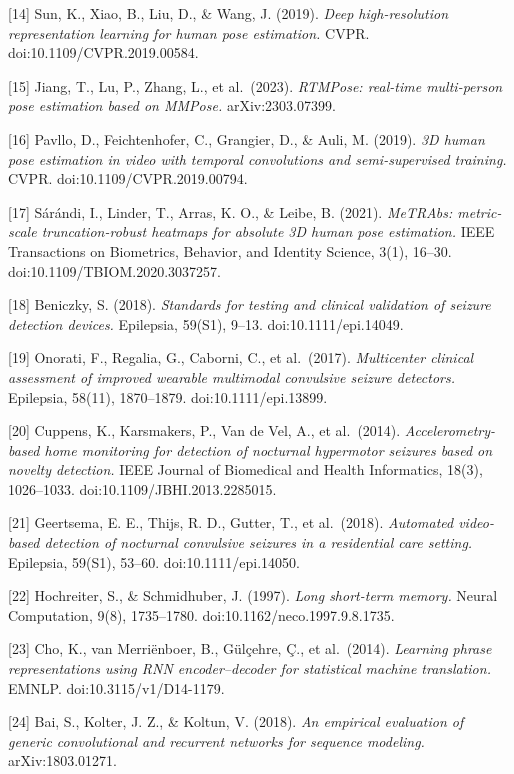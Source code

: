\documentclass[
  11pt,
]{article}
\begin{document}
{[}14{]} Sun, K., Xiao, B., Liu, D., \& Wang, J. (2019). \emph{Deep
high-resolution representation learning for human pose estimation.}
CVPR. doi:10.1109/CVPR.2019.00584.

{[}15{]} Jiang, T., Lu, P., Zhang, L., et al.~(2023). \emph{RTMPose:
real-time multi-person pose estimation based on MMPose.}
arXiv:2303.07399.

{[}16{]} Pavllo, D., Feichtenhofer, C., Grangier, D., \& Auli, M.
(2019). \emph{3D human pose estimation in video with temporal
convolutions and semi-supervised training.} CVPR.
doi:10.1109/CVPR.2019.00794.

{[}17{]} Sárándi, I., Linder, T., Arras, K. O., \& Leibe, B. (2021).
\emph{MeTRAbs: metric-scale truncation-robust heatmaps for absolute 3D
human pose estimation.} IEEE Transactions on Biometrics, Behavior, and
Identity Science, 3(1), 16--30. doi:10.1109/TBIOM.2020.3037257.

{[}18{]} Beniczky, S. (2018). \emph{Standards for testing and clinical
validation of seizure detection devices.} Epilepsia, 59(S1), 9--13.
doi:10.1111/epi.14049.

{[}19{]} Onorati, F., Regalia, G., Caborni, C., et al.~(2017).
\emph{Multicenter clinical assessment of improved wearable multimodal
convulsive seizure detectors.} Epilepsia, 58(11), 1870--1879.
doi:10.1111/epi.13899.

{[}20{]} Cuppens, K., Karsmakers, P., Van de Vel, A., et al.~(2014).
\emph{Accelerometry-based home monitoring for detection of nocturnal
hypermotor seizures based on novelty detection.} IEEE Journal of
Biomedical and Health Informatics, 18(3), 1026--1033.
doi:10.1109/JBHI.2013.2285015.

{[}21{]} Geertsema, E. E., Thijs, R. D., Gutter, T., et al.~(2018).
\emph{Automated video-based detection of nocturnal convulsive seizures
in a residential care setting.} Epilepsia, 59(S1), 53--60.
doi:10.1111/epi.14050.

{[}22{]} Hochreiter, S., \& Schmidhuber, J. (1997). \emph{Long
short-term memory.} Neural Computation, 9(8), 1735--1780.
doi:10.1162/neco.1997.9.8.1735.

{[}23{]} Cho, K., van Merriënboer, B., Gülçehre, Ç., et al.~(2014).
\emph{Learning phrase representations using RNN encoder--decoder for
statistical machine translation.} EMNLP. doi:10.3115/v1/D14-1179.

{[}24{]} Bai, S., Kolter, J. Z., \& Koltun, V. (2018). \emph{An
empirical evaluation of generic convolutional and recurrent networks for
sequence modeling.} arXiv:1803.01271.
\end{document}
